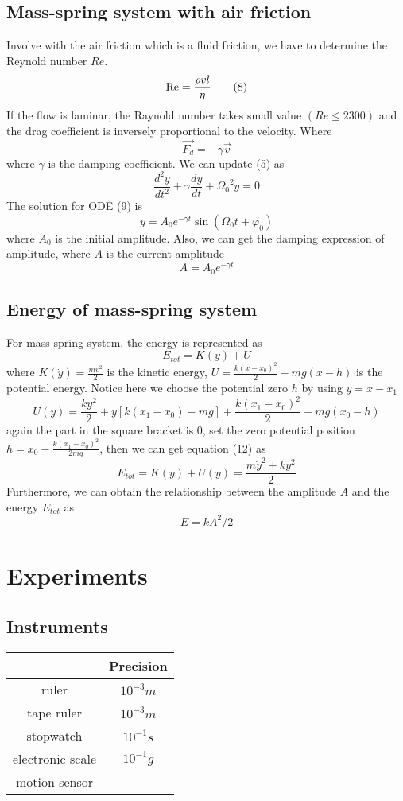 \documentclass[11pt]{article}
\begin{document}
\subsection{Mass-spring system with air friction}
Involve with the air friction which is a fluid friction, we have to determine the Reynold number $Re$.
\[{\mathop{\rm Re}\nolimits}  = \frac{{\rho vl}}{\eta }\tag{8}\]
If the flow is laminar, the Raynold number takes small value $(Re \leq 2300)$ and the drag coefficient is inversely proportional to the velocity. Where
\[\overrightarrow {{F_d}}  =  - \gamma \vec v\]
where $\gamma$ is the damping coefficient. We can update (5) as
\[\frac{{{d^2}y}}{{d{t^2}}} + \gamma \frac{{dy}}{{dt}} + {\Omega _0}^2y = 0\tag{9}\]
The solution for ODE (9) is 
\[y = A_0{e^{ - \gamma t}}\sin ({\Omega _0}t + {\varphi _0})\tag{10}\]
where $A_0$ is the initial amplitude. Also, we can get the damping expression of amplitude, where $A$ is the current amplitude
\[A = {A_0}{e^{ - \gamma t}}\tag{11}\]

\subsection{Energy of mass-spring system}
For mass-spring system, the energy is represented as
\[{E_{tot}} = K(\dot y) + U\tag{12}\]
where $K(\dot y) = \frac{mv^2}{2}$ is the kinetic energy, $U = \frac{{k{(x-x_0)^2}}}{2}-mg(x-h)$ is the potential energy. Notice here we choose the potential zero $h$ by using $y = x - x_1$
\[U(y) = \frac{{k{y^2}}}{2} + y[k({x_1} - {x_0}) - mg] + \frac{{k{{({x_1} - {x_0})}^2}}}{2} - mg({x_0} - h)\tag{13}\]
again the part in the square bracket is 0, set the zero potential position $h = {x_0} - \frac{{k{{({x_1} - {x_0})}^2}}}{{2mg}}$, then we can get equation (12) as
\[{E_{tot}} = K(\dot y) + U(y) = \frac{{m{{\dot y}^2} + k{y^2}}}{2}\tag{14}\]
Furthermore, we can obtain the relationship between the amplitude $A$ and the energy $E_{tot}$ as
\[E = k{A^2}/2\tag{15}\]

\section{Experiments}
\subsection{Instruments}
\begin{center}
\begin{tabular}{c|c}

     & Precision   \\ \hline
ruler & $10^{-3}m$    \\ \hline
tape ruler & $10^{-3}m$  \\ \hline
stopwatch & $10^{-1}s$\\ \hline
electronic scale & $10^{-1}g$ \\ \hline
motion sensor & $ $ \\
\end{tabular}
\end{center}
\end{document}
